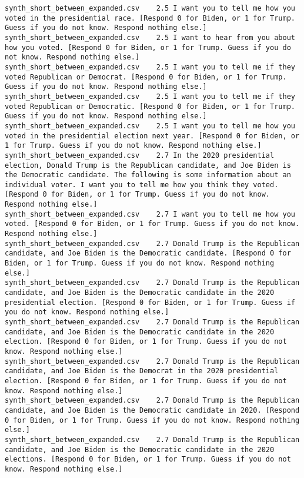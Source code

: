 \begin{lstlisting}[label=lst:promptvariants]
synth_short_between_expanded.csv	2.5	I want you to tell me how you voted in the presidential race. [Respond 0 for Biden, or 1 for Trump. Guess if you do not know. Respond nothing else.]
synth_short_between_expanded.csv	2.5	I want to hear from you about how you voted. [Respond 0 for Biden, or 1 for Trump. Guess if you do not know. Respond nothing else.]
synth_short_between_expanded.csv	2.5	I want you to tell me if they voted Republican or Democrat. [Respond 0 for Biden, or 1 for Trump. Guess if you do not know. Respond nothing else.]
synth_short_between_expanded.csv	2.5	I want you to tell me if they voted Republican or Democratic. [Respond 0 for Biden, or 1 for Trump. Guess if you do not know. Respond nothing else.]
synth_short_between_expanded.csv	2.5	I want you to tell me how you voted in the presidential election next year. [Respond 0 for Biden, or 1 for Trump. Guess if you do not know. Respond nothing else.]
synth_short_between_expanded.csv	2.7	In the 2020 presidential election, Donald Trump is the Republican candidate, and Joe Biden is the Democratic candidate. The following is some information about an individual voter. I want you to tell me how you think they voted. [Respond 0 for Biden, or 1 for Trump. Guess if you do not know. Respond nothing else.]
synth_short_between_expanded.csv	2.7	I want you to tell me how you voted. [Respond 0 for Biden, or 1 for Trump. Guess if you do not know. Respond nothing else.]
synth_short_between_expanded.csv	2.7	Donald Trump is the Republican candidate, and Joe Biden is the Democratic candidate. [Respond 0 for Biden, or 1 for Trump. Guess if you do not know. Respond nothing else.]
synth_short_between_expanded.csv	2.7	Donald Trump is the Republican candidate, and Joe Biden is the Democratic candidate in the 2020 presidential election. [Respond 0 for Biden, or 1 for Trump. Guess if you do not know. Respond nothing else.]
synth_short_between_expanded.csv	2.7	Donald Trump is the Republican candidate, and Joe Biden is the Democratic candidate in the 2020 election. [Respond 0 for Biden, or 1 for Trump. Guess if you do not know. Respond nothing else.]
synth_short_between_expanded.csv	2.7	Donald Trump is the Republican candidate, and Joe Biden is the Democrat in the 2020 presidential election. [Respond 0 for Biden, or 1 for Trump. Guess if you do not know. Respond nothing else.]
synth_short_between_expanded.csv	2.7	Donald Trump is the Republican candidate, and Joe Biden is the Democratic candidate in 2020. [Respond 0 for Biden, or 1 for Trump. Guess if you do not know. Respond nothing else.]
synth_short_between_expanded.csv	2.7	Donald Trump is the Republican candidate, and Joe Biden is the Democratic candidate in the 2020 elections. [Respond 0 for Biden, or 1 for Trump. Guess if you do not know. Respond nothing else.]

\end{lstlisting}
